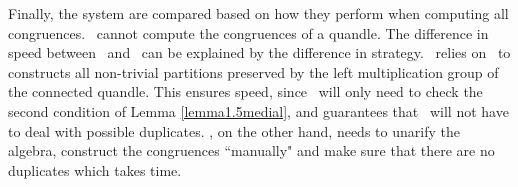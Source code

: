 \noindent Finally, the system are compared based on how they perform when computing all congruences. \rig~cannot compute the congruences of a quandle. The difference in speed between \Software~and \cream~can be explained by the difference in strategy. \Software~relies on \magma~to constructs all non-trivial partitions preserved by the left multiplication group of the connected quandle. This ensures speed, since \Software~will only need to check the second condition of Lemma \ref{lemma1.5medial}, and guarantees that \Software~will not have to deal with possible duplicates. \cream, on the other hand, needs to unarify the algebra, construct the congruences ``manually" and make sure that there are no duplicates which takes time.